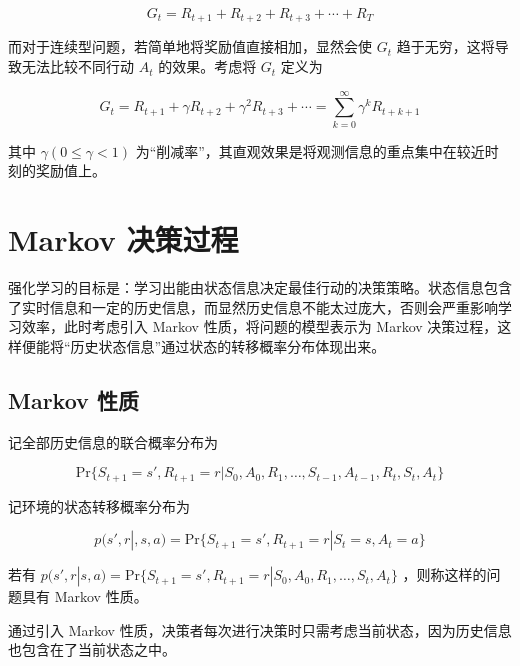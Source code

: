 \begin{equation}
G_t = R_{t+1}+R_{t+2}+R_{t+3}+\cdots+R_T
\end{equation}

而对于连续型问题，若简单地将奖励值直接相加，显然会使 $G_t$ 趋于无穷，这将导致无法比较不同行动 $A_t$ 的效果。考虑将 $G_t$ 定义为

\begin{equation}
G_t = R_{t+1}+\gamma R_{t+2}+\gamma^2 R_{t+3}+\cdots = \sum_{k=0}^{\infty}\gamma^kR_{t+k+1}
\end{equation}

其中 $\gamma(0\leq \gamma < 1)$ 为“削减率”，其直观效果是将观测信息的重点集中在较近时刻的奖励值上。

\section{Markov 决策过程}

强化学习的目标是：学习出能由状态信息决定最佳行动的决策策略\cite{sutton2018reinforcement}。状态信息包含了实时信息和一定的历史信息，而显然历史信息不能太过庞大，否则会严重影响学习效率，此时考虑引入 Markov 性质，将问题的模型表示为 Markov 决策过程\cite{howard1960dynamic}，这样便能将“历史状态信息”通过状态的转移概率分布体现出来\cite{ross1996stochastic}。

\subsection{Markov 性质}

记全部历史信息的联合概率分布为

\begin{equation}
    \mathrm{Pr}\{S_{t+1}=s',R_{t+1}=r|S_0,A_0,R_1,\ldots,S_{t-1},A_{t-1},R_t,S_t,A_t\}
\end{equation}

记环境的状态转移概率分布为

\begin{equation}
    p(s',r|,s,a) = \mathrm{Pr}\{S_{t+1}=s',R_{t+1}=r|S_t=s,A_t=a\}
\end{equation}

\begin{definition}
    若有 $p(s',r|s,a) = \mathrm{Pr}\{S_{t+1}=s',R_{t+1}=r|S_0,A_0,R_1,\ldots,S_t,A_t\}$ ，则称这样的问题具有 { Markov 性质}。
\end{definition}

通过引入 Markov 性质，决策者每次进行决策时只需考虑当前状态，因为历史信息也包含在了当前状态之中。

